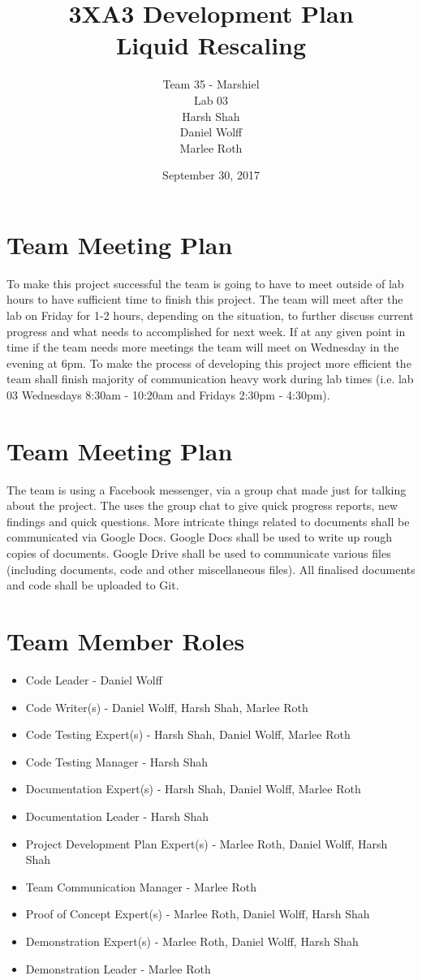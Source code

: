 \documentclass{article}
\title{3XA3 Development Plan\\
Liquid Rescaling}
\author{Team 35 - Marshiel \\
Lab 03\\
Harsh Shah \\
Daniel Wolff\\
Marlee Roth}
\date{September 30, 2017}
\begin{document}
\maketitle

\section{Team Meeting Plan}
To make this project successful the team is going to have to meet outside of lab hours to have sufficient time to finish this project. The team will meet after the lab on Friday for 1-2 hours, depending on the situation, to further discuss current progress and what needs to accomplished for next week. If at any given point in time if the team needs more meetings the team will meet on Wednesday in the evening at 6pm. To make the process of developing this project more efficient the team shall finish majority of communication heavy work during lab times (i.e. lab 03 Wednesdays 8:30am - 10:20am and Fridays 2:30pm - 4:30pm).

\section{Team Meeting Plan}
The team is using a Facebook messenger, via a group chat made just for talking about the project. The uses the group chat to give quick progress reports, new findings and quick questions. More intricate things related to documents shall be communicated via Google Docs.  Google Docs shall be used to write up rough copies of documents. Google Drive shall be used to communicate various files (including documents, code and other miscellaneous files). All finalised documents and code shall be uploaded to Git.

\newpage
\section{Team Member Roles}
\begin{itemize}
    \item Code Leader - Daniel Wolff
    \item Code Writer(s) - Daniel Wolff, Harsh Shah, Marlee Roth 
    \item Code Testing Expert(s) - Harsh Shah, Daniel Wolff, Marlee Roth 
    \item Code Testing Manager - Harsh Shah 
    \item Documentation Expert(s) - Harsh Shah, Daniel Wolff, Marlee Roth 
    \item Documentation Leader - Harsh Shah 
    \item Project Development Plan Expert(s) - Marlee Roth, Daniel Wolff, Harsh Shah 
    \item Team Communication Manager - Marlee Roth 
    \item Proof of Concept Expert(s) - Marlee Roth, Daniel Wolff, Harsh Shah 
    \item Demonstration Expert(s) - Marlee Roth, Daniel Wolff, Harsh Shah 
    \item Demonstration Leader - Marlee Roth 
\end{itemize}
\end{document}
